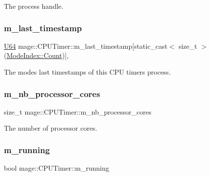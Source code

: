 The process handle. \hypertarget{classmage_1_1_c_p_u_timer_a14b5ef7beba6c33769ac66ef171d0f0b}{}\label{classmage_1_1_c_p_u_timer_a14b5ef7beba6c33769ac66ef171d0f0b} 
\subsubsection{\texorpdfstring{m\+\_\+last\+\_\+timestamp}{m\_last\_timestamp}}
{\footnotesize\ttfamily \hyperlink{namespacemage_a6672cf3c861707ce4a3235a3eb43941d}{U64} mage\+::\+C\+P\+U\+Timer\+::m\+\_\+last\+\_\+timestamp\mbox{[}static\+\_\+cast$<$ size\+\_\+t $>$(\hyperlink{classmage_1_1_c_p_u_timer_a98d59db3c396b14269c937e016c7625eae93f994f01c537c4e2f7d8528c3eb5e9}{Mode\+Index\+::\+Count})\mbox{]}\hspace{0.3cm}{\ttfamily [mutable]}, {\ttfamily [private]}}

The modes\textquotesingle{} last timestamps of this C\+PU timer\textquotesingle{}s process. \hypertarget{classmage_1_1_c_p_u_timer_ac5fdb38a70c74815231b5efd8d746be1}{}\label{classmage_1_1_c_p_u_timer_ac5fdb38a70c74815231b5efd8d746be1} 
\subsubsection{\texorpdfstring{m\+\_\+nb\+\_\+processor\+\_\+cores}{m\_nb\_processor\_cores}}
{\footnotesize\ttfamily size\+\_\+t mage\+::\+C\+P\+U\+Timer\+::m\+\_\+nb\+\_\+processor\+\_\+cores\hspace{0.3cm}{\ttfamily [private]}}

The number of processor cores. \hypertarget{classmage_1_1_c_p_u_timer_a7190afa453085b7bbd7cb76ff6bb62f2}{}\label{classmage_1_1_c_p_u_timer_a7190afa453085b7bbd7cb76ff6bb62f2} 
\subsubsection{\texorpdfstring{m\+\_\+running}{m\_running}}
{\footnotesize\ttfamily bool mage\+::\+C\+P\+U\+Timer\+::m\+\_\+running\hspace{0.3cm}{\ttfamily [private]}}

